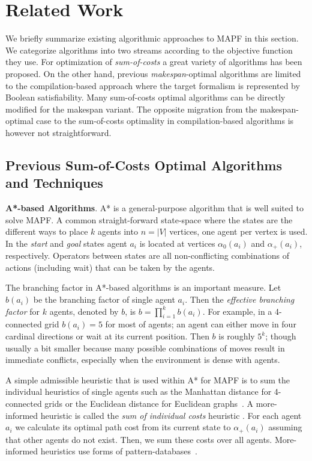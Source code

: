 \documentclass[jair,oneside,11pt]{article}
\begin{document}
\section{Related Work}

We briefly summarize existing algorithmic approaches to MAPF in this section. We categorize algorithms into two streams according to the objective function they use. For optimization of {\em sum-of-costs} a great variety of algorithms has been proposed. On the other hand, previous {\em makespan}-optimal algorithms are limited to the compilation-based approach where the target formalism is represented by Boolean satisfiability. Many sum-of-costs optimal algorithms can be directly modified for the makespan variant. The opposite migration from the makespan-optimal case to the sum-of-costs optimality in compilation-based algorithms is however not straightforward. 

\subsection{Previous Sum-of-Costs Optimal Algorithms and Techniques}

{\bf A*-based Algorithms}. A* is a general-purpose algorithm that is well suited to solve MAPF. A common
straight-forward state-space where the states are the different ways to place $k$ agents into
$n=|V|$ vertices, one agent per vertex is used. In the {\em start} and {\em goal} states
agent $a_i$ is located at vertices $\alpha_0(a_i)$ and $\alpha_+(a_i)$, respectively. Operators
between states are all non-conflicting combinations of actions (including wait)
that can be taken by the agents.

The branching factor in A*-based algorithms is an important measure. Let $b(a_i)$ be the branching factor of single agent $a_i$. Then the {\em effective branching factor} for $k$ agents, denoted by $b$, is $b=\prod_{i=1}^k b(a_i)$. For example, in a 4-connected grid $b(a_i)=5$ for most of agents; an agent can either move in four cardinal directions or wait at its current position. Then $b$ is roughly ${5}^k$; though
usually a bit smaller because many possible combinations of moves result
in immediate conflicts, especially when the environment is dense with agents.

A simple admissible heuristic that is used within A* for MAPF is to sum
the individual heuristics of single agents such as the Manhattan distance for
4-connected grids or the Euclidean distance for Euclidean
graphs~\cite{ryan2008exploiting}. A more-informed heuristic is called the {\em
sum of individual costs} heuristic . For each agent $a_i$ we
calculate its optimal path cost from its current state to $\alpha_+(a_i)$ assuming
that other agents do not exist. Then, we sum these costs over all
agents. More-informed heuristics use forms of pattern-databases~\cite{DBLP:conf/socs/GoldenbergFSHS13,EPEJAIR}.
\end{document}
